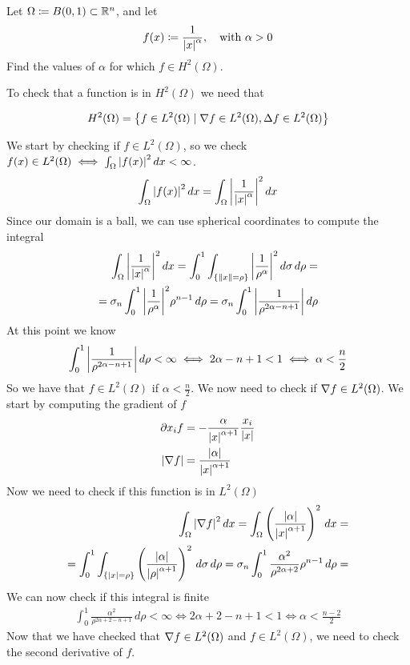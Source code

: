 \newpage
\begin{exercise}
    Let \(\Omega \coloneqq B(0, 1) \subset \mathbb{R}^n\), and let 
    \[
        f(x) \coloneqq \frac{1}{\abs{x}^\alpha}, \quad \text{with } \alpha > 0
    \]
    Find the values of \(\alpha\) for which \(f \in H^2(\Omega)\).
\end{exercise}
To check that a function is in \(H^2(\Omega)\) we need that
\begin{remark}
    \[
        H^2(\Omega) = \left\{ f \in L^2(\Omega) \mid \nabla f \in L^2(\Omega), \Delta f \in L^2(\Omega) \right\}
    \]  
\end{remark}
We start by checking if \(f \in L^2(\Omega)\), so we check \(f(x) \in L^2(\Omega) \iff \int_\Omega \abs{f(x)}^2 \, dx < \infty\).
\[
    \begin{split}
        \int_\Omega \abs{f(x)}^2 \, dx = \int_\Omega \abs{\frac{1}{\abs{x}^\alpha}}^2 \, dx
    \end{split}
\]
Since our domain is a ball, we can use spherical coordinates to compute the integral
\[
    \begin{split}
        \int_\Omega \abs{\frac{1}{\abs{x}^\alpha}}^2 \, dx = \int_0^1 \int_{\left\{\norm{x} = \rho\right\}} \abs{\frac{1}{\rho^\alpha}}^2 \, d\sigma \, d\rho = \\
        = \sigma_n \int_0^1 \abs{\frac{1}{\rho^\alpha}}^2 \rho^{n-1} \, d\rho = \sigma_n \int_0^1 \abs{\frac{1}{\rho^{2\alpha - n +1}}} \, d\rho
    \end{split}
\]
At this point we know 
\[
    \begin{split}
        \int_0^1 \abs{\frac{1}{\rho^{2\alpha - n + 1}}} \, d\rho < \infty \iff 2 \alpha - n + 1 < 1 \iff \alpha < \frac{n}{2}
    \end{split}
\]
So we have that \(f \in L^2(\Omega)\) if \(\alpha < \frac{n}{2}\). We now need to check if \(\nabla f \in L^2(\Omega)\). We start by computing the gradient of \(f\)
\[
    \begin{split}
        \partial x_i f &= -\frac{\alpha}{\abs{x}^{\alpha + 1}} \frac{x_i}{\abs{x}}  \\
        \abs{\nabla f} &= \frac{\abs{\alpha}}{\abs{x}^{\alpha + 1}}
    \end{split}
\]
Now we need to check if this function is in \(L^2(\Omega)\)
\[
    \begin{split}
        \int_\Omega \abs{\nabla f}^2 \, dx = \int_\Omega \left(\frac{\abs{\alpha}}{\abs{x}^{\alpha + 1}}\right)^2 \, dx = \\
        = \int_0^1 \int_{\left\{\abs{x} = \rho\right\}} \left(\frac{\abs{\alpha}}{\abs{\rho}^{\alpha + 1}}\right)^2 \, d\sigma \, d\rho = \sigma_n \int_0^1 \frac{\alpha^2}{\rho^{2\alpha + 2}} \rho^{n-1} \, d\rho = \\
    \end{split}
\]
We can now check if this integral is finite
\[
    \begin{split}
        \int_0^1 \frac{\alpha^2}{\rho^{2\alpha + 2 - n + 1}} \, d\rho < \infty \iff 2\alpha + 2 - n + 1 < 1 \iff \alpha < \frac{n - 2}{2}
    \end{split}
\]
Now that we have checked that \(\nabla f \in L^2(\Omega)\) and \(f \in L^2(\Omega)\), we need to check the second derivative of \(f\).

